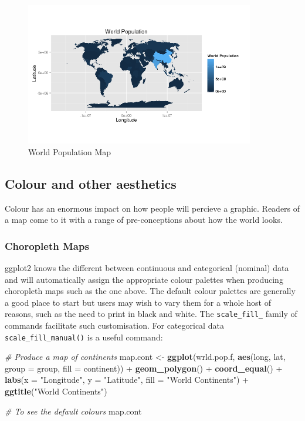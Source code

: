 \documentclass[]{article}
\newenvironment{Shaded}{}{}
\newcommand{\KeywordTok}[1]{\textcolor[rgb]{0.00,0.44,0.13}{\textbf{{#1}}}}
\newcommand{\DataTypeTok}[1]{\textcolor[rgb]{0.56,0.13,0.00}{{#1}}}
\newcommand{\StringTok}[1]{\textcolor[rgb]{0.25,0.44,0.63}{{#1}}}
\newcommand{\CommentTok}[1]{\textcolor[rgb]{0.38,0.63,0.69}{\textit{{#1}}}}
\newcommand{\NormalTok}[1]{{#1}}
\let\Oldincludegraphics\includegraphics
\renewcommand{\includegraphics}[1]{\Oldincludegraphics[width=10cm]{#1}}
\begin{document}
\begin{figure}[htbp]
\centering
\includegraphics{figure/World_Population_Map.png}
\caption{World Population Map}
\end{figure}

\subsection{Colour and other aesthetics}

Colour has an enormous impact on how people will percieve a graphic.
Readers of a map come to it with a range of pre-conceptions about how
the world looks.

\subsubsection{Choropleth Maps}

ggplot2 knows the different between continuous and categorical (nominal)
data and will automatically assign the appropriate colour palettes when
producing choropleth maps such as the one above. The default colour
palettes are generally a good place to start but users may wish to vary
them for a whole host of reasons, such as the need to print in black and
white. The \texttt{scale\_fill\_} family of commands facilitate such
customisation. For categorical data \texttt{scale\_fill\_manual()} is a
useful command:

\begin{Shaded}
\begin{Highlighting}[]
\CommentTok{# Produce a map of continents}
\NormalTok{map.cont <- }\KeywordTok{ggplot}\NormalTok{(wrld.pop.f, }\KeywordTok{aes}\NormalTok{(long, lat, }\DataTypeTok{group =} \NormalTok{group, }\DataTypeTok{fill =} \NormalTok{continent)) + }
    \KeywordTok{geom_polygon}\NormalTok{() + }\KeywordTok{coord_equal}\NormalTok{() + }\KeywordTok{labs}\NormalTok{(}\DataTypeTok{x =} \StringTok{"Longitude"}\NormalTok{, }\DataTypeTok{y =} \StringTok{"Latitude"}\NormalTok{, }\DataTypeTok{fill =} \StringTok{"World Continents"}\NormalTok{) + }
    \KeywordTok{ggtitle}\NormalTok{(}\StringTok{"World Continents"}\NormalTok{)}

\CommentTok{# To see the default colours}
\NormalTok{map.cont}
\end{Highlighting}
\end{Shaded}
\end{document}
